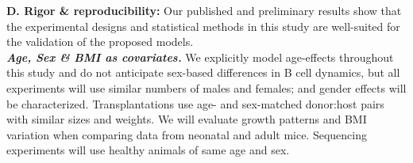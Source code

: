 \documentclass[11pt]{article}
\begin{document}
\textbf{D. Rigor \& reproducibility:}
Our published and preliminary results show that the experimental designs and statistical methods in this study are well-suited for the validation of the proposed models. \\ %
\textbf{\textit{Age, Sex \& BMI as covariates.}}
We explicitly model age-effects throughout this study and do not anticipate sex-based differences in B cell dynamics, but all experiments will use similar numbers of males and females; and gender effects will be characterized.
Transplantations use age- and sex-matched donor:host pairs with similar sizes and weights.
We will evaluate growth patterns and BMI variation when comparing data from neonatal and adult mice. 
Sequencing experiments will use healthy animals of same age and sex.
%
%






%
%
\end{document}
